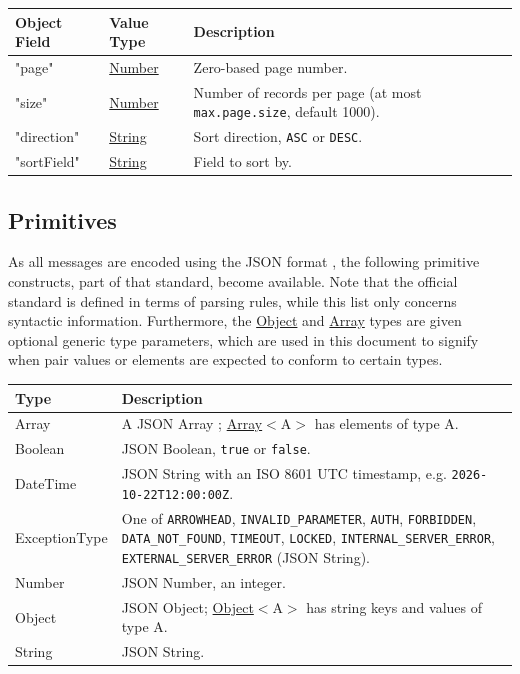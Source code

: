 \documentclass[a4paper]{arrowhead}
\newcommand{\pdef}[1]{{\textcolor{ArrowheadGrey}{#1 \label{sec:model:primitives:#1} \label{sec:model:primitives:#1s}}}}
\newcommand{\pref}[1]{{\textcolor{ArrowheadGrey}{\hyperref[sec:model:primitives:#1]{#1}}}}
\begin{document}
\noindent\begin{tabularx}{\textwidth}{| >{\raggedright\arraybackslash}p{3.9cm} | >{\raggedright\arraybackslash\small}p{5.3cm} | X |} \hline
\rowcolor{gray!33} Object Field & Value Type & Description \\ \hline
"page" & \pref{Number} & Zero-based page number. \\ \hline
"size" & \pref{Number} & Number of records per page (at most \texttt{max.\allowbreak{}page.\allowbreak{}size}, default 1000). \\ \hline
"direction" & \pref{String} & Sort direction, \texttt{ASC} or \texttt{DESC}. \\ \hline
"sort\allowbreak{}Field" & \pref{String} & Field to sort by. \\ \hline
\end{tabularx}



\subsection{Primitives}
\label{sec:model:primitives}

As all messages are encoded using the JSON format \cite{rfc8259}, the following primitive constructs, part of that standard, become available.
Note that the official standard is defined in terms of parsing rules, while this list only concerns syntactic information.
Furthermore, the \pref{Object} and \pref{Array} types are given optional generic type parameters, which are used in this document to signify when pair values or elements are expected to conform to certain types.

\noindent\begin{tabularx}{\textwidth}{| p{4.6cm} | X |} \hline
\rowcolor{gray!33} Type & Description \\ \hline
\pdef{Array} & A JSON Array \cite{rfc8259}; \pref{Array}$<$A$>$ has elements of type A. \\ \hline
\pdef{Boolean} & JSON Boolean, \texttt{true} or \texttt{false}. \\ \hline
\pdef{DateTime} & JSON String with an ISO 8601 UTC timestamp, e.g. \texttt{2026-10-22T12:00:00Z}. \\ \hline
\pdef{ExceptionType} & One of \texttt{ARROWHEAD}, \texttt{INVALID\_\allowbreak{}PARAMETER}, \texttt{AUTH}, \texttt{FORBIDDEN}, \texttt{DATA\_\allowbreak{}NOT\_\allowbreak{}FOUND}, \texttt{TIMEOUT}, \texttt{LOCKED}, \texttt{INTERNAL\_\allowbreak{}SERVER\_\allowbreak{}ERROR}, \texttt{EXTERNAL\_\allowbreak{}SERVER\_\allowbreak{}ERROR} (JSON String). \\ \hline
\pdef{Number} & JSON Number, an integer. \\ \hline
\pdef{Object} & JSON Object; \pref{Object}$<$A$>$ has string keys and values of type A. \\ \hline
\pdef{String} & JSON String. \\ \hline
\end{tabularx}
\end{document}
